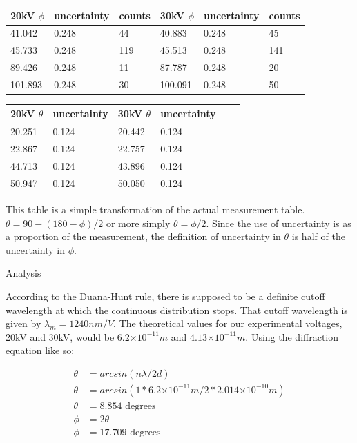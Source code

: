 \documentclass{article}
\providecommand{\e}[1]{\ensuremath{\times 10^{#1}}}
\begin{document}
\begin{tabular}{| l | l | l | l | l | l |}
\hline
20kV $\phi$ & uncertainty & counts & 30kV $\phi$ & uncertainty & counts \\
\hline
41.042 & 0.248 & 44 & 40.883 & 0.248 & 45 \\
\hline
45.733 & 0.248 & 119 & 45.513 & 0.248 & 141 \\
\hline
89.426 & 0.248 & 11 & 87.787 & 0.248 & 20 \\
\hline
101.893 & 0.248 & 30 & 100.091 & 0.248 & 50 \\
\hline
\end{tabular}

\begin{tabular}{| l | l | l | l | l | l |}
\hline
20kV $\theta$ & uncertainty & 30kV $\theta$ & uncertainty \\
\hline
20.251 & 0.124  & 20.442 & 0.124  \\
\hline
22.867 & 0.124  & 22.757 & 0.124  \\
\hline
44.713 & 0.124  & 43.896 & 0.124  \\
\hline
50.947 & 0.124  & 50.050 & 0.124  \\
\hline
\end{tabular}

This table is a simple transformation of the actual measurement table. $\theta = 90 - (180 - \phi) / 2$ or more simply $\theta = \phi / 2$. Since the use of uncertainty is as a proportion of the measurement, the definition of uncertainty in $\theta$ is half of the uncertainty in $\phi$.

\begin{center} Analysis \end{center}


According to the Duana-Hunt rule, there is supposed to be a definite cutoff wavelength at which the continuous distribution stops. That cutoff wavelength is given by $\lambda_m = 1240 nm / V$. The theoretical values for our experimental voltages, 20kV and 30kV, would be $6.2\e{-11} m$ and $4.13\e{-11} m$. Using the diffraction equation like so:  

\begin{align*}
\theta &= arcsin(n \lambda / 2 d) \\
\theta &= arcsin(1 * 6.2\e{-11} m / 2 * 2.014\e{-10} m) \\
\theta &= 8.854 \text{ degrees} \\
\phi &= 2 \theta \\
\phi &= 17.709 \text{ degrees} 
\end{align*}
\end{document}
